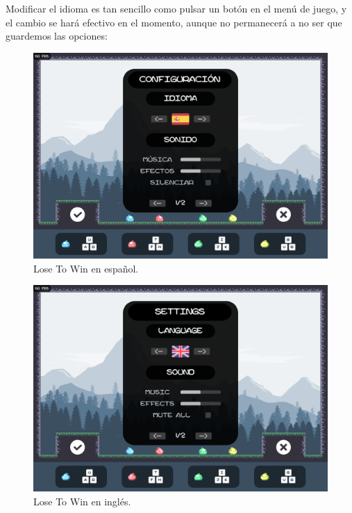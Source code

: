 \documentclass[12pt, spanish]{article}
\begin{document}
Modificar el idioma es tan sencillo como pulsar un botón en el menú de juego, y el cambio se hará efectivo en el momento, aunque no permanecerá a no ser que guardemos las opciones:


\begin{figure}[H]
	\centering
	\includegraphics[width=\textwidth]{"opciones/idiomas/spanish.png"}
	\caption{Lose To Win en español.}\label{figure:spanish}
\end{figure}

\begin{figure}[H]
	\centering
	\includegraphics[width=\textwidth]{"opciones/idiomas/english.png"}
	\caption{Lose To Win en inglés.}\label{figure:english}
\end{figure}
\end{document}
